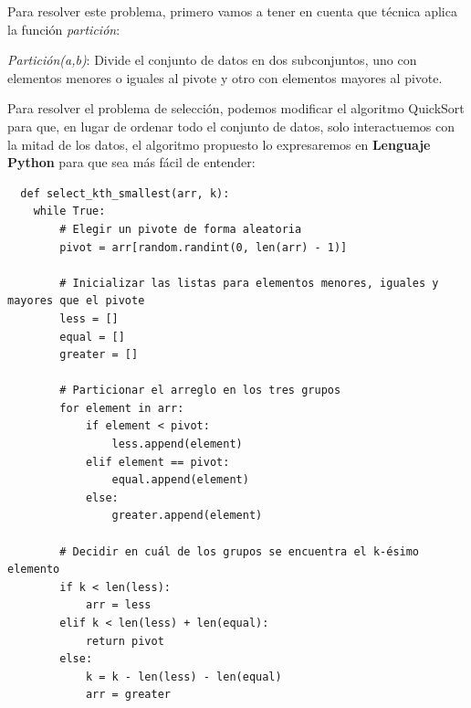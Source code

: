 \documentclass[answers, 11pt]{exam}
\begin{document}
\begin{questions}

\begin{solution}
  Para resolver este problema, primero vamos a tener en cuenta que técnica aplica 
  la función \textit{partición}:
    
    \begin{center}
      \fbox
    {
    \begin{minipage}{0.85\textwidth}
      \textit{Partición(a,b)}: Divide el conjunto de datos en dos subconjuntos, 
      uno con elementos menores o iguales
      al pivote y otro con elementos mayores al pivote.
    \end{minipage}
    }
    \end{center}
    Para resolver el problema de selección, podemos modificar el algoritmo 
    QuickSort para que, en lugar de ordenar todo el conjunto de datos, solo 
    interactuemos con la mitad de los datos, el algoritmo propuesto lo expresaremos
    en \textbf{Lenguaje Python} para que sea más fácil de entender:

    \begin{verbatim}
  def select_kth_smallest(arr, k):
    while True:
        # Elegir un pivote de forma aleatoria
        pivot = arr[random.randint(0, len(arr) - 1)]
        
        # Inicializar las listas para elementos menores, iguales y mayores que el pivote
        less = []
        equal = []
        greater = []
        
        # Particionar el arreglo en los tres grupos
        for element in arr:
            if element < pivot:
                less.append(element)
            elif element == pivot:
                equal.append(element)
            else:
                greater.append(element)
        
        # Decidir en cuál de los grupos se encuentra el k-ésimo elemento
        if k < len(less):
            arr = less
        elif k < len(less) + len(equal):
            return pivot
        else:
            k = k - len(less) - len(equal)
            arr = greater
    \end{verbatim}


\end{solution}
\end{questions}
\end{document}
